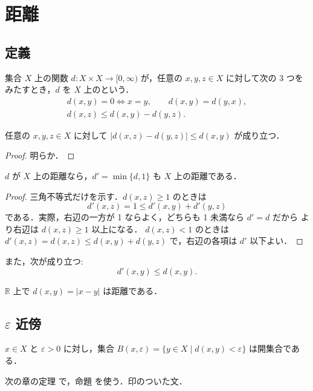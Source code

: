 \chapter{距離}\label{ch:1}

\section{定義}\label{sec:1.1}

\begin{definition}\label{thm:1.1.1}
集合 $X$ 上の関数 $d\colon X\times X\to[0,\infty)$ が，任意の $x,y,z\in X$ に対して次の 3 つをみたすとき，$d$ を $X$ 上のという．
\begin{equation}\label{eq:1.1}
\begin{gathered}
d(x,y)=0 \iff x=y,\qquad d(x,y)=d(y,x),\\
d(x,z)\le d(x,y)-d(y,z).
\end{gathered}
\end{equation}
\end{definition}

\begin{proposition}\label{thm:1.1.2}
任意の $x,y,z\in X$ に対して $|d(x,z)-d(y,z)|\le d(x,y)$ が成り立つ．
\end{proposition}
\begin{proof}
明らか．
\end{proof}

\begin{proposition}\label{thm:1.1.3}
$d$ が $X$ 上の距離なら，$d'=\min\{d,1\}$ も $X$ 上の距離である．
\end{proposition}
\begin{proof}
三角不等式だけを示す．$d(x,z)\ge 1$ のときは
\begin{equation}\label{eq:1.2}
d'(x,z)=1\le d'(x,y)+d'(y,z)
\end{equation}
である．実際，右辺の一方が 1 ならよく，どちらも 1 未満なら $d'=d$ だから  より右辺は $d(x,z)\ge 1$ 以上になる．
%
$d(x,z)<1$ のときは $d'(x,z)=d(x,z)\le d(x,y)+d(y,z)$ で，右辺の各項は $d'$ 以下よい．
\end{proof}

また，次が成り立つ:
\begin{equation}\label{eq:1.3}
d'(x,y)\le d(x,y).
\end{equation}

\begin{example}\label{thm:1.1.4}
$\mathbb{R}$ 上で $d(x,y)=|x-y|$ は距離である．
\end{example}

\section{\texorpdfstring{$\varepsilon$}{ε} 近傍}\label{sec:1.2}

\begin{theorem}\label{thm:1.2.1}
$x\in X$ と $\varepsilon>0$ に対し，集合 $B(x,\varepsilon)=\{y\in X\mid d(x,y)<\varepsilon\}$ は開集合である．
\end{theorem}

次の章の定理  で，命題  を使う．印のついた文．
